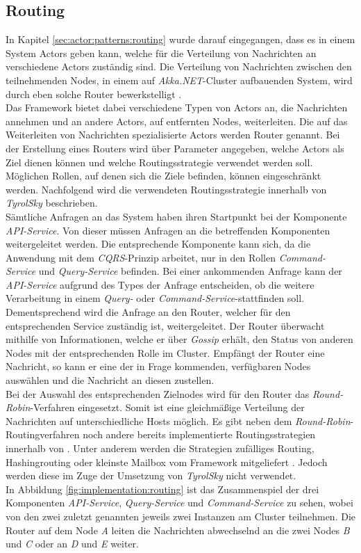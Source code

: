 \subsection{Routing}
\label{subsec:implementation:akkaRouting}
In Kapitel \ref{sec:actor:patterns:routing} wurde darauf eingegangen, dass es in einem System Actors geben kann, welche für die Verteilung von Nachrichten an verschiedene Actors zuständig sind. Die Verteilung von Nachrichten zwischen den teilnehmenden Nodes, in einem auf \textit{Akka.NET}-Cluster aufbauenden System, wird durch eben solche Router bewerkstelligt \citep{Akka.NETCommunityAkka.NETDocumentation}. \\
Das Framework bietet dabei verschiedene Typen von Actors an, die Nachrichten annehmen und an andere Actors, auf entfernten Nodes, weiterleiten. Die auf das Weiterleiten von Nachrichten spezialisierte Actors werden Router genannt. Bei der Erstellung eines Routers wird über Parameter angegeben, welche Actors als Ziel dienen können und welche Routingsstrategie verwendet werden soll. Möglichen Rollen, auf denen sich die Ziele befinden, können eingeschränkt werden. Nachfolgend wird die verwendeten Routingsstrategie innerhalb von \textit{TyrolSky} beschrieben. \\
Sämtliche Anfragen an das System haben ihren Startpunkt bei der Komponente \textit{API-Service}. Von dieser müssen Anfragen an die betreffenden Komponenten weitergeleitet werden. Die entsprechende Komponente kann sich, da die Anwendung mit dem \textit{CQRS}-Prinzip arbeitet, nur in den Rollen \textit{Command-Service} und \textit{Query-Service} befinden. Bei einer ankommenden Anfrage kann der \textit{API-Service} aufgrund des Types der Anfrage entscheiden, ob die weitere Verarbeitung in einem \textit{Query-} oder \textit{Command-Service}-stattfinden soll. Dementsprechend wird die Anfrage an den Router, welcher für den entsprechenden Service zuständig ist, weitergeleitet. Der Router überwacht mithilfe von Informationen, welche er über \textit{Gossip} erhält, den Status von anderen Nodes mit der entsprechenden Rolle im Cluster. Empfängt der Router eine Nachricht, so kann er eine der in Frage kommenden, verfügbaren Nodes auswählen und die Nachricht an diesen zustellen. \\
Bei der Auswahl des entsprechenden Zielnodes wird für den Router das \textit{Round-Robin}-Verfahren eingesetzt. Somit ist eine gleichmäßige Verteilung der Nachrichten auf unterschiedliche Hosts möglich. Es gibt neben dem \textit{Round-Robin}-Routingverfahren noch andere bereits implementierte Routingsstrategien innerhalb von . Unter anderem werden die Strategien zufälliges Routing, Hashingrouting oder kleinste Mailbox vom Framework mitgeliefert \citep{Akka.NETCommunityAkka.NETDocumentation}. Jedoch werden diese im Zuge der Umsetzung von \textit{TyrolSky} nicht verwendet. \\
In Abbildung \ref{fig:implementation:routing} ist das Zusammenspiel der drei Komponenten \textit{API-Service}, \textit{Query-Service} und \textit{Command-Service} zu sehen, wobei von den zwei zuletzt genannten jeweils zwei Instanzen am Cluster teilnehmen. Die Router auf dem Node \textit{A} leiten die Nachrichten abwechselnd an die zwei Nodes \textit{B} und \textit{C} oder an \textit{D} und \textit{E} weiter. 

